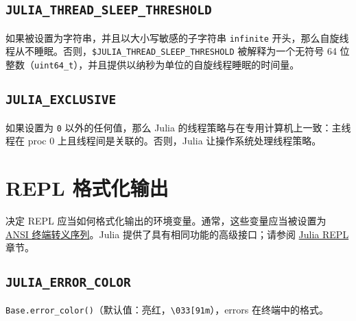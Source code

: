 \hypertarget{10532418503410947704}{}


\subsection{\texttt{JULIA\_THREAD\_SLEEP\_THRESHOLD}}



如果被设置为字符串，并且以大小写敏感的子字符串 \texttt{{\textquotedbl}infinite{\textquotedbl}} 开头，那么自旋线程从不睡眠。否则，\texttt{\$JULIA\_THREAD\_SLEEP\_THRESHOLD} 被解释为一个无符号 64 位整数（\texttt{uint64\_t}），并且提供以纳秒为单位的自旋线程睡眠的时间量。



\hypertarget{12794875033848178110}{}


\subsection{\texttt{JULIA\_EXCLUSIVE}}



如果设置为 \texttt{0} 以外的任何值，那么 Julia 的线程策略与在专用计算机上一致：主线程在 proc 0 上且线程间是关联的。否则，Julia 让操作系统处理线程策略。



\hypertarget{16378430867132816632}{}


\section{REPL 格式化输出}



决定 REPL 应当如何格式化输出的环境变量。通常，这些变量应当被设置为 \href{http://ascii-table.com/ansi-escape-sequences.php}{ANSI 终端转义序列}。Julia 提供了具有相同功能的高级接口；请参阅 \hyperlink{10670790884919535588}{Julia REPL} 章节。



\hypertarget{13891100922495428417}{}


\subsection{\texttt{JULIA\_ERROR\_COLOR}}



\texttt{Base.error\_color()}（默认值：亮红，\texttt{{\textquotedbl}{\textbackslash}033[91m{\textquotedbl}}），errors 在终端中的格式。



\hypertarget{17711733982596187514}{}


